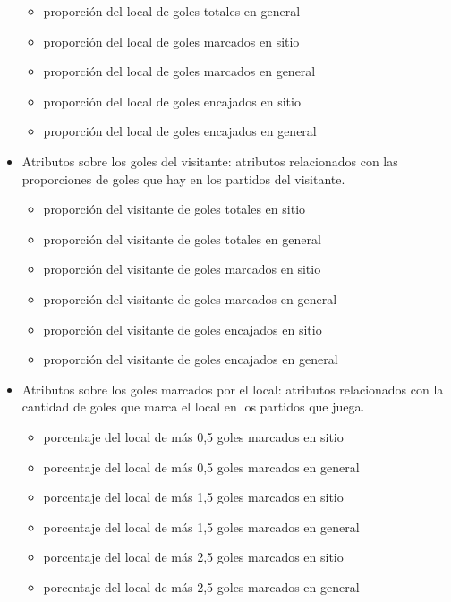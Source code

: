 \begin{itemize}
\begin{itemize}
              \item proporción del local de goles totales en general
              \item proporción del local de goles marcados en sitio
              \item proporción del local de goles marcados en general
              \item proporción del local de goles encajados en sitio
              \item proporción del local de goles encajados en general
          \end{itemize}
    \item Atributos sobre los goles del visitante: atributos relacionados con las proporciones de goles que hay en los partidos del visitante.
          \begin{itemize}
              \item proporción del visitante de goles totales en sitio
              \item proporción del visitante de goles totales en general
              \item proporción del visitante de goles marcados en sitio
              \item proporción del visitante de goles marcados en general
              \item proporción del visitante de goles encajados en sitio
              \item proporción del visitante de goles encajados en general
          \end{itemize}
    \item Atributos sobre los goles marcados por el local: atributos relacionados con la cantidad de goles que marca el local en los partidos que juega.
          \begin{itemize}
              \item porcentaje del local de más 0,5 goles marcados en sitio
              \item porcentaje del local de más 0,5 goles marcados en general
              \item porcentaje del local de más 1,5 goles marcados en sitio
              \item porcentaje del local de más 1,5 goles marcados en general
              \item porcentaje del local de más 2,5 goles marcados en sitio
              \item porcentaje del local de más 2,5 goles marcados en general
          \end{itemize}

\end{itemize}

